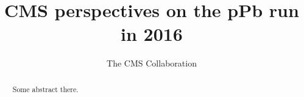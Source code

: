\documentclass[12pt]{article}
\title{CMS perspectives on the pPb run in 2016}
\author
{ The CMS Collaboration }
\date{}
\begin{document}
 


\baselineskip24pt


\maketitle 


\begin{abstract}

Some abstract there. 

\end{abstract}














\clearpage
\end{document}
